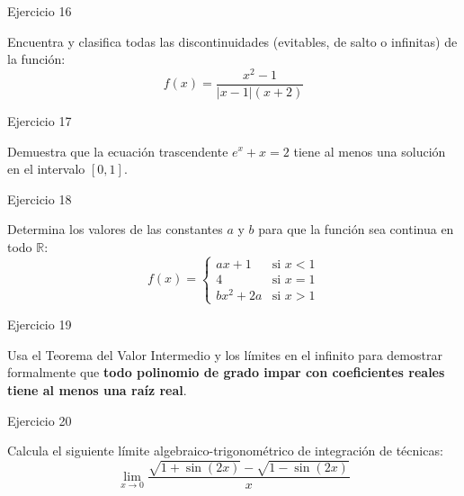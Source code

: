 \documentclass[aspectratio=169]{beamer}
\begin{document}
\begin{frame}{Ejercicio 16}
  \begin{mwejercicio}
    Encuentra y clasifica todas las discontinuidades (evitables, de salto o infinitas) de la función:
    $$f(x) = \frac{x^2 - 1}{|x - 1|(x + 2)}$$
  \end{mwejercicio}
  \vspace{3.5cm}
\end{frame}
\begin{frame}{Ejercicio 17}
  \begin{mwejercicio}
    Demuestra que la ecuación trascendente $e^x + x = 2$ tiene al menos una solución en el intervalo $[0, 1]$.
  \end{mwejercicio}
  \vspace{3.5cm}
\end{frame}
\begin{frame}{Ejercicio 18}
  \begin{mwejercicio}
    Determina los valores de las constantes $a$ y $b$ para que la función sea continua en todo $\mathbb{R}$:
    $$f(x) = \begin{cases}
      ax + 1 & \text{si } x < 1 \\
      4 & \text{si } x = 1 \\
      bx^2 + 2a & \text{si } x > 1
    \end{cases}$$
  \end{mwejercicio}
  \vspace{3.5cm}
\end{frame}
\begin{frame}{Ejercicio 19}
  \begin{mwejercicio}
    Usa el Teorema del Valor Intermedio y los límites en el infinito para demostrar formalmente que \textbf{todo polinomio de grado impar con coeficientes reales tiene al menos una raíz real}.
  \end{mwejercicio}
  \vspace{3.5cm}
\end{frame}
\begin{frame}{Ejercicio 20}
  \begin{mwejercicio}
    Calcula el siguiente límite algebraico-trigonométrico de integración de técnicas:
    $$\lim_{x \to 0} \frac{\sqrt{1 + \sin(2x)} - \sqrt{1 - \sin(2x)}}{x}$$
  \end{mwejercicio}
  \vspace{3.5cm}
\end{frame}
\end{document}
